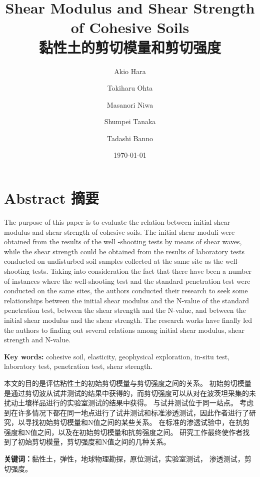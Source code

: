 \documentclass{myarticle}
\title{\textbf{Shear Modulus and Shear Strength of Cohesive Soils\\黏性土的剪切模量和剪切强度}}
\date{\today}
\author{Akio Hara \and Tokiharu Ohta \and Masanori Niwa \and Shumpei Tanaka \and Tadashi Banno}
\begin{document}
\maketitle

\section*{Abstract 摘要}

\begin{paracol}{2}

    The purpose of this paper is to evaluate the relation between initial shear modulus and shear strength of cohesive soils. The initial shear moduli were obtained from the results of the well -shooting tests by means of shear waves, while the shear strength could be obtained from the results of laboratory tests conducted on undisturbed soil samples collected at the same site as the well-shooting tests. Taking into consideration the fact that there have been a number of instances where the well-shooting test and the standard penetration test were conducted on the same sites, the authors conducted their research to seek some relationships between the initial shear modulus and the N-value of the standard penetration test, between the shear strength and the N-value, and between the initial shear modulus and the shear strength. The research works have finally led the authors to finding out several relations among initial shear modulus, shear strength and N-value.

    \textbf{Key words: }cohesive soil, elasticity, geophysical exploration, in-situ test, laboratory test, penetration test, shear strength.

    \switchcolumn

    本文的目的是评估粘性土的初始剪切模量与剪切强度之间的关系。 初始剪切模量是通过剪切波从试井测试的结果中获得的，而剪切强度可以从对在波茨坦采集的未扰动土壤样品进行的实验室测试的结果中获得。 与试井测试位于同一站点。 考虑到在许多情况下都在同一地点进行了试井测试和标准渗透测试，因此作者进行了研究，以寻找初始剪切模量和N值之间的某些关系。 在标准的渗透试验中，在抗剪强度和N值之间，以及在初始剪切模量和抗剪强度之间。 研究工作最终使作者找到了初始剪切模量，剪切强度和N值之间的几种关系。

    \textbf{关键词：}黏性土，弹性，地球物理勘探，原位测试，实验室测试， 渗透测试，剪切强度。

\end{paracol}










\end{document}
